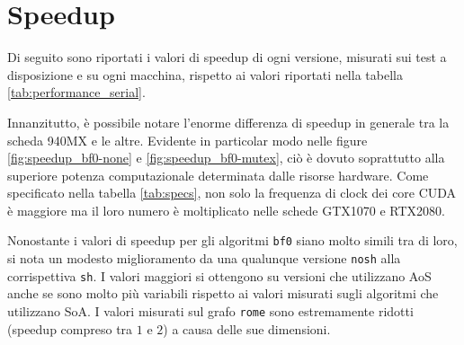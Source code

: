 \documentclass[12pt,a4paper,oneside]{book}
\begin{document}
	\section{Speedup}
	Di seguito sono riportati i valori di speedup di ogni versione, misurati sui test a disposizione e su ogni macchina, rispetto ai valori riportati nella tabella \ref{tab:performance_serial}.
	
	Innanzitutto, è possibile notare l'enorme differenza di speedup in generale tra la scheda 940MX e le altre. Evidente in particolar modo nelle figure \ref{fig:speedup_bf0-none} e \ref{fig:speedup_bf0-mutex}, ciò è dovuto soprattutto alla superiore potenza computazionale determinata dalle risorse hardware. Come specificato nella tabella \ref{tab:specs}, non solo la frequenza di clock dei core CUDA è maggiore ma il loro numero è moltiplicato nelle schede GTX1070 e RTX2080.
	
	Nonostante i valori di speedup per gli algoritmi \texttt{bf0} siano molto simili tra di loro, si nota un modesto miglioramento da una qualunque versione \texttt{nosh} alla corrispettiva \texttt{sh}. I valori maggiori si ottengono su versioni che utilizzano AoS anche se sono molto più variabili rispetto ai valori misurati sugli algoritmi che utilizzano SoA. I valori misurati sul grafo \texttt{rome} sono estremamente ridotti (speedup compreso tra $1$ e $2$) a causa delle sue dimensioni.
	
\end{document}
